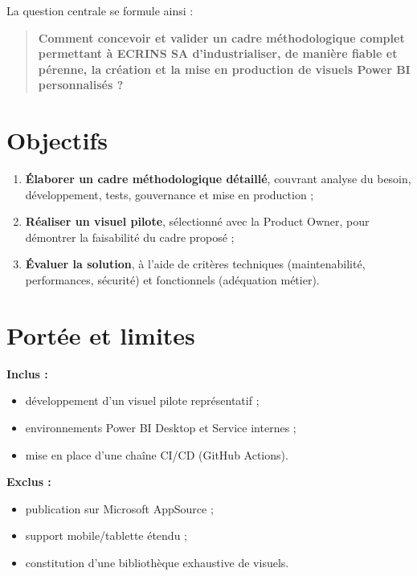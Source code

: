 \noindent
La question centrale se formule ainsi :

\begin{quote}
\textbf{Comment concevoir et valider un cadre méthodologique complet permettant à ECRINS SA d’industrialiser, de manière fiable et pérenne, la création et la mise en production de visuels Power BI personnalisés ?}
\end{quote}

\section{Objectifs}

\begin{enumerate}[label=\textbf{O\arabic*}]
  \item \textbf{Élaborer un cadre méthodologique détaillé}, couvrant analyse du besoin, développement, tests, gouvernance et mise en production ;
  \item \textbf{Réaliser un visuel pilote}, sélectionné avec la Product Owner, pour démontrer la faisabilité du cadre proposé ;
  \item \textbf{Évaluer la solution}, à l’aide de critères techniques (maintenabilité, performances, sécurité) et fonctionnels (adéquation métier).
\end{enumerate}

\section{Portée et limites}

\textbf{Inclus :}
\begin{itemize}
  \item développement d’un visuel pilote représentatif ;
  \item environnements Power BI Desktop et Service internes ;
  \item mise en place d’une chaîne CI/CD (GitHub Actions).
\end{itemize}

\textbf{Exclus :}
\begin{itemize}
  \item publication sur Microsoft AppSource ;
  \item support mobile/tablette étendu ;
  \item constitution d’une bibliothèque exhaustive de visuels.
\end{itemize}

